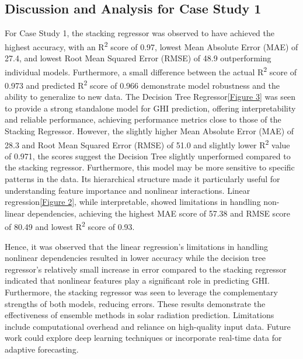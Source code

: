 \documentclass[10pt,twocolumn]{article}
\begin{document}
\subsection{Discussion and Analysis for Case Study 1}
For Case Study 1, the stacking regressor was observed to have achieved the highest accuracy, with an R\textsuperscript{2} score of 0.97, lowest Mean Absolute Error (MAE) of 27.4, and lowest Root Mean Squared Error (RMSE) of 48.9 outperforming individual models. Furthermore, a small difference between the actual R\textsuperscript{2} score of 0.973 and predicted R\textsuperscript{2} score of 0.966 demonstrate model robustness and the ability to generalize to new data.
The Decision Tree Regressor\ref{Figure 3} was seen to provide a strong standalone model for GHI prediction, offering interpretability and reliable performance, achieving performance metrics close to those of the Stacking Regressor. However, the slightly higher Mean Absolute Error (MAE) of 28.3 and Root Mean Squared Error (RMSE) of 51.0 and slightly lower  R\textsuperscript{2} value of 0.971, the scores suggest the Decision Tree slightly unperformed compared to the stacking regressor. Furthermore, this model may be more sensitive to specific patterns in the data. Its hierarchical structure made it particularly useful for understanding feature importance and nonlinear interactions. 
Linear regression\ref{Figure 2}, while interpretable, showed limitations in handling non-linear dependencies, achieving the highest MAE score of 57.38 and RMSE score of 80.49 and lowest R\textsuperscript{2} score of 0.93. 

Hence, it was observed that the linear regression's  limitations in handling nonlinear dependencies resulted in lower accuracy while the decision tree regressor's relatively small increase in error compared to the stacking regressor indicated that nonlinear features play a significant role in predicting GHI. Furthermore,
the stacking regressor was seen to leverage the complementary strengths of both models, reducing errors. These results demonstrate the effectiveness of ensemble methods in solar radiation prediction. Limitations include computational overhead and reliance on high-quality input data. Future work could explore deep learning techniques or incorporate real-time data for adaptive forecasting.
\end{document}
